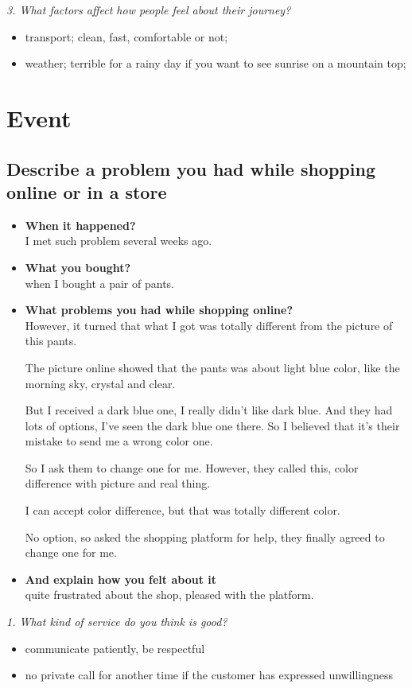 \documentclass[conference]{IEEEtran}
\begin{document}
\textit{3. What factors affect how people feel about their journey?}
\begin{itemize}
    \item transport; clean, fast, comfortable or not;
    \item weather; terrible for a rainy day if you want to see sunrise on a mountain top;
\end{itemize}

\section{Event}
\subsection{Describe a problem you had while shopping online or in a store}
\begin{itemize}
    \item \textbf{When it happened?}\\
    I met such problem several weeks ago.
    \item \textbf{What you bought?}\\
    when I bought a pair of pants.
    \item \textbf{What problems you had while shopping online?}\\
    However, it turned that what I got was totally different from the picture of this pants.

    The picture online showed that the pants was about light blue color, like the morning sky, crystal and clear.

    But I received a dark blue one, I really didn't like dark blue.
    And they had lots of options, I've seen the dark blue one there.
    So I believed that it's their mistake to send me a wrong color one.

    So I ask them to change one for me.
    However, they called this, color difference with picture and real thing.

    I can accept color difference, but that was totally different color.

    No option, so asked the shopping platform for help, they finally agreed to change one for me.
    \item \textbf{And explain how you felt about it}\\
    quite frustrated about the shop, pleased with the platform.
\end{itemize}

\textit{1. What kind of service do you think is good?}
\begin{itemize}
    \item communicate patiently, be respectful
    \item no private call for another time if the customer has expressed unwillingness 
\end{itemize}
\end{document}
